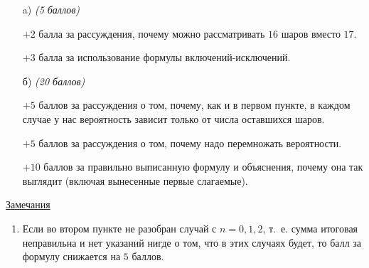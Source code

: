 \begin{enumerate}
	\item[a)] \textit{(5 баллов)}
	\item[] 
		$+2$ балла за рассуждения, почему можно рассматривать $16$ шаров
		вместо $17$.
	
		$+3$ балла за использование формулы включений-исключений.
	
	\item[б)] \textit{(20 баллов)}

		$+5$ баллов за рассуждения о том, почему, как и в первом
		пункте, в каждом случае у нас вероятность зависит только от
		числа оставшихся шаров.
	
		$+5$ баллов за рассуждения о том, почему надо 
		перемножать вероятности.

		$+10$ баллов за правильно выписанную формулу и объяснения,
		почему она так выглядит (включая вынесенные первые слагаемые).
\end{enumerate}	

	\underline{Замечания} 
\begin{enumerate}
	\item Если во втором пункте не разобран случай с $n = 0, 1, 2$,
	т.~е. сумма итоговая неправильна и нет указаний нигде о том,
	что в этих случаях будет, то балл за формулу снижается на $5$ баллов.
\end{enumerate}